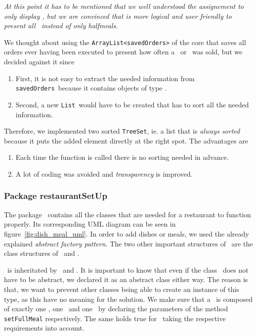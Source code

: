 \textit{At this point it has to be mentioned that we well understood the assignement
to only display \HalfMeal, but we are convinced that is more logical
and user friendly to present all \Meal~instead of only halfmeals.}

We thought about using the \lstinline|ArrayList<savedOrders>|
of the core that saves all orders ever having been executed 
to present how often a \Meal~or \Dish~was sold, but we decided against it since
\begin{enumerate}
	\item First, it is not easy to extract the needed information
  from \lstinline|savedOrders|~because it contains objects of type \Order.
	\item Second, a new \lstinline|List|~would have to be created
  that has to sort all the needed information.
\end{enumerate}
Therefore, we implemented two sorted \lstinline|TreeSet|, 
ie. a list that is \emph{always sorted} because it puts the added 
element directly at the right spot. 
The advantages are
\begin{enumerate}
	\item Each time the function is called there is no sorting needed in advance.
	\item A lot of coding was avoided and \emph{transparency} is improved.
\end{enumerate}


\subsubsection{Package restaurantSetUp} %
\label{ssub:restaurantsetup}

The package \restaurantSetup~contains all the classes that are needed
for a restaurant to function properly.
Its corresponding UML diagram can be seen in figure~\ref{fig:dish_meal_uml}.
In order to add dishes or meals, we used the already explained \emph{abstract
factory pattern}. The two other important structures of 
\restaurantSetup~are the class structures of \Meal~and \Dish. 

\Meal~is inheritated by \HalfMeal~and \FullMeal. 
It is important to know that even if the class \Meal~does not have to be abstract,
we declared it as an abstract class either way. 
The reason is that, we want to prevent other classes being able to 
create an instance of this type, as this have no meaning for the solution.
We make sure that a \FullMeal~is composed of exactly one \Starter,
one \MainDish~and one \Dessert~by declaring the parameters of the method
\lstinline|setFullMeal| respectively.
The same holds true for \HalfMeal~taking the respective requirements into account.

